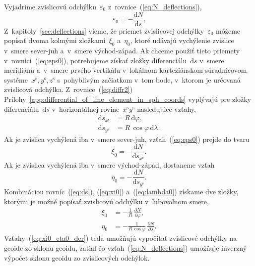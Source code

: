 \documentclass[a4paper, 12pt]{book}
\newcommand{\diff}{\mathrm d}
\begin{document}
Vyjadrime zvislicovú odchýlku~$\varepsilon_0$ 
z~rovnice~(\ref{eq:N_deflections}),
%
\begin{equation}
\label{eq:eps0}
\varepsilon_0 = -\frac{\diff N}{\diff s}{.}
\end{equation}
%
Z~kapitoly~\ref{sec:deflections} vieme, že priemet zvislicovej 
odchýlky~$\varepsilon_0$ môžeme popísať dvoma kolmými zložkami~$\xi_0$ 
a~$\eta_0$, ktoré udávajú vychýlenie zvislice v~smere sever-juh a~v~smere 
východ-západ.  Ak chceme použiť tieto priemety v~rovnici~(\ref{eq:eps0}), 
potrebujeme získať zložky diferenciálu~$\diff s$ v~smere meridiánu a~v~smere 
prvého vertikálu v~lokálnom karteziánskom súradnicovom systéme~$x^\mathrm{s}, 
y^\mathrm{s}, z^\mathrm{s}$ s~pohyblivým začiatkom v~tom bode, v~ktorom je 
určovaná zvislicová odchýlka.  Z~rovnice~(\ref{eq:diffr2}) 
Prílohy~\ref{app:differential_of_line_element_in_sph_coords} vyplývajú pre 
zložky diferenciálu~$\diff s$ v~horizontálnej rovine~$x^\mathrm{s} 
y^\mathrm{s}$ nasledujúce vzťahy,
%
\begin{equation}
\label{eq:ds}
\begin{split}
\diff s_{x^\mathrm{s}} &= R \, \diff \varphi{,}\\
%
\diff s_{y^\mathrm{s}} &= R \, \cos\varphi \, \diff \lambda{.}
\end{split}
\end{equation}
%
Ak je zvislica vychýlená iba v~smere sever-juh, vzťah~(\ref{eq:eps0}) prejde do 
tvaru
%
\begin{equation}
\label{eq:xi0}
\xi_0 = -\frac{\diff N}{\diff s_{x^{\mathrm{s}}}}{.}
\end{equation}
%
Ak je zvislica vychýlená iba v~smere východ-západ, dostaneme vzťah
%
\begin{equation}
\label{eq:lambda0}
\eta_0 = -\frac{\diff N}{\diff s_{y^{\mathrm{s}}}}{.}
\end{equation}
%
Kombináciou rovníc~(\ref{eq:ds}), (\ref{eq:xi0}) a~(\ref{eq:lambda0}) získame 
dve zložky, ktorými je možné popísať zvislicovú odchýlku v~ľubovoľnom smere,
%
\begin{equation}
\begin{split}
\label{eq:xi0_eta0_der}
\xi_0 &= -\frac{1}{R} \, \frac{\partial N}{\partial \varphi}{,}\\
%
\eta_0 &= -\frac{1}{R \, \cos\varphi} \, \frac{\partial N}{\partial \lambda}{.}
\end{split}
\end{equation}
%
Vzťahy~(\ref{eq:xi0_eta0_der}) teda umožňujú vypočítať zvislicové odchýlky na 
geoide zo sklonu geoidu, zatiaľ čo vzťah~(\ref{eq:N_deflections}) umožňuje 
inverzný výpočet sklonu geoidu zo zvislicových odchýlok.
\end{document}
